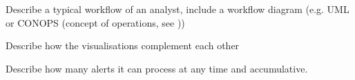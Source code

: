 Describe a typical workflow of an analyst, include a workflow diagram (e.g. UML or CONOPS (concept of operations, see ))

Describe how the visualisations complement each other

Describe how many alerts it can process at any time and accumulative.